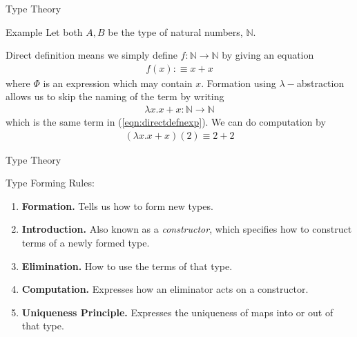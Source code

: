 \documentclass[10pt]{beamer}
\begin{document}
\begin{frame}{Type Theory}
\begin{exampleblock}{Example}
Let both $A, B$ be the type of natural numbers, $\mathbb{N}$. 

Direct definition means we simply define $f :\mathbb{N} \to \mathbb{N}$ by giving an equation
\begin{align}
f(x): \equiv x+x \label{eqn:directdefnexp}%
\end{align}
where $\Phi$ is an expression which may contain $x$. Formation using $\lambda-$abstraction allows us to skip the naming of the term by writing
\begin{align*}
\lambda x.x+x: \mathbb{N} \to \mathbb{N}
\end{align*}
which is the same term in (\ref{eqn:directdefnexp}). We can do computation by 
\begin{align*}
(\lambda x.x+x) (2) \equiv 2 + 2
\end{align*}

\end{exampleblock}
\end{frame}


\begin{frame}{Type Theory}
\begin{alertblock}{Type Forming Rules:}
\begin{enumerate}
\item \textbf{Formation.} Tells us how to form new types.
\item \textbf{Introduction.} Also known as a \emph{constructor}, which specifies how to construct terms of a newly formed type.
\item \textbf{Elimination.} How to use the terms of that type.
\item \textbf{Computation.} Expresses how an eliminator acts on a constructor.
\item \textbf{Uniqueness Principle.} Expresses the uniqueness of maps into or out of that type.
\end{enumerate}
\end{alertblock}

\end{frame}
\end{document}

